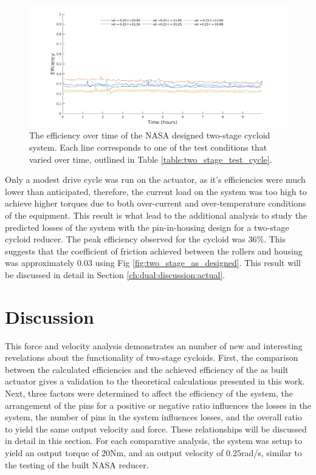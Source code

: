 \begin{figure}[h]
	\centering
	\includegraphics[width=0.75\linewidth]{fig/two_stage_eff}
   \caption{The efficiency over time of the NASA designed two-stage cycloid system. Each line corresponds to one of the test conditions that varied over time, outlined in Table \ref{table:two_stage_test_cycle}.}
   \label{fig:two_stage_eff}
\end{figure}

Only a modest drive cycle was run on the actuator, as it's efficiencies were much lower than anticipated, therefore, the current load on the system was too high to achieve higher torques due to both over-current and over-temperature conditions of the equipment. This result is what lead to the additional analysis to study the predicted losses of the system with the pin-in-housing design for a two-stage cycloid reducer. The peak efficiency observed for the cycloid was 36\%. This suggests that the coefficient of friction achieved between the rollers and housing was approximately 0.03 using Fig \ref{fig:two_stage_as_designed}. This result will be discussed in detail in Section \ref{ch:dual:discussion:actual}.


\section{Discussion} \label{ch:dual:discussion}

This force and velocity analysis demonstrates an number of new and interesting revelations about the functionality of two-stage cycloids. First, the comparison between the calculated efficiencies and the achieved efficiency of the as built actuator gives a validation to the theoretical calculations presented in this work. Next, three factors were determined to affect the efficiency of the system, the arrangement of the pins for a positive or negative ratio influences the losses in the system, the number of pins in the system influences losses, and the overall ratio to yield the same output velocity and force. These relationships will be discussed in detail in this section. For each comparative analysis, the system was setup to yield an output torque of 20Nm, and an output velocity of 0.25rad/s, similar to the testing of the built NASA reducer.

